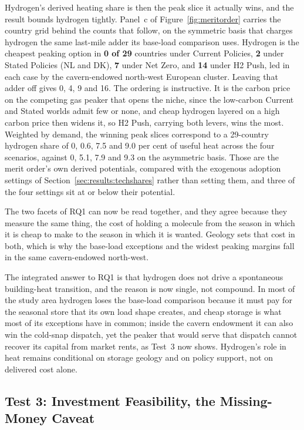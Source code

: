 Hydrogen's derived heating share is then the peak slice it actually wins, and the
result bounds hydrogen tightly. Panel~c of Figure~\ref{fig:meritorder} carries the
country grid behind the counts that follow, on the symmetric basis that charges hydrogen
the same last-mile adder its base-load comparison uses. Hydrogen is the cheapest peaking
option in
\textbf{0 of 29} countries under Current Policies, \textbf{2} under Stated Policies (NL
and DK), \textbf{7} under Net Zero, and \textbf{14} under H2 Push, led in each case
by the cavern-endowed north-west European cluster. Leaving that adder off gives
0, 4, 9 and 16. The ordering is instructive. It
is the carbon price on the competing gas peaker that opens the niche, since the
low-carbon Current and Stated worlds admit few or none, and cheap hydrogen layered
on a high carbon price then widens it, so H2 Push, carrying both levers, wins the
most. Weighted by demand, the winning peak slices correspond to a 29-country hydrogen share
of 0, 0.6, 7.5 and 9.0 per cent of useful heat across the four scenarios, against
0, 5.1, 7.9 and 9.3 on the asymmetric basis. Those are the merit order's own derived potentials, compared with the exogenous adoption settings of Section~\ref{sec:results:techshares} rather than setting them, and three of the four settings sit at or below their potential.

The two facets of RQ1 can now be read together, and they agree because they measure the
same thing, the cost of holding a molecule from the season in which it is cheap to make
to the season in which it is wanted. Geology sets that cost in both, which is why the
base-load exceptions and the widest peaking margins fall in the same cavern-endowed
north-west.

The integrated answer to RQ1 is that hydrogen does not drive a spontaneous building-heat
transition, and the reason is now single, not compound. In most of the study area
hydrogen loses the base-load comparison because it must pay for the seasonal store that
its own load shape creates, and cheap storage is what most of its exceptions have in
common; inside the cavern endowment it can also win the cold-snap dispatch, yet the
peaker that would serve that dispatch cannot recover its capital from market rents, as
Test~3 now shows. Hydrogen's role in heat remains conditional on storage geology and on
policy support, not on delivered cost alone.

\subsection{Test 3: Investment Feasibility, the Missing-Money Caveat}
\label{sec:results:missingmoney}


